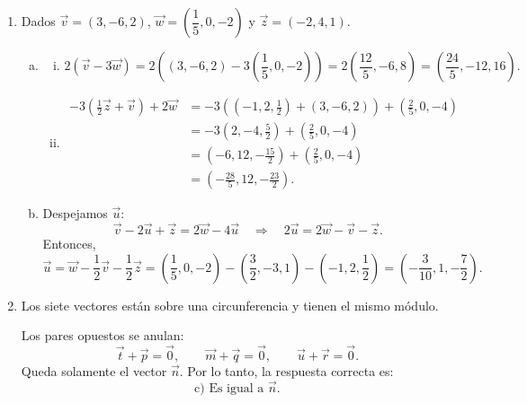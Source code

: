 \begin{enumerate}[\hspace{-3mm}$1)$]
\item Dados $\vec v=(3,-6,2)$, $\vec w=\left(\dfrac15,0,-2\right)$ y $\vec z=(-2,4,1)$.
\begin{sol}
\begin{enumerate}[a)]
\item
\begin{enumerate}[i)]
\item
\[
2(\vec v-3\vec w)=2\left((3,-6,2)-3\left(\frac15,0,-2\right)\right)
=2\left(\frac{12}{5},-6,8\right)=\left(\frac{24}{5},-12,16\right).
\]
\item
\[
\begin{aligned}
-3\left(\frac12\vec z+\vec v\right)+2\vec w
&=-3\left((-1,2,\frac12)+(3,-6,2)\right)+\left(\frac25,0,-4\right)\\
&=-3\left(2,-4,\frac52\right)+\left(\frac25,0,-4\right)\\
&=(-6,12,-\frac{15}{2})+\left(\frac25,0,-4\right)\\
&=\left(-\frac{28}{5},12,-\frac{23}{2}\right).
\end{aligned}
\]
\end{enumerate}
\item Despejamos $\vec u$:
\[
\vec v-2\vec u+\vec z=2\vec w-4\vec u
\quad\Rightarrow\quad
2\vec u=2\vec w-\vec v-\vec z.
\]
Entonces,
\[
\vec u=\vec w-\frac12\vec v-\frac12\vec z
=\left(\frac15,0,-2\right)-\left(\frac32,-3,1\right)-(-1,2,\frac12)
=\left(-\frac{3}{10},1,-\frac72\right).
\]
\end{enumerate}
\end{sol}

\item Los siete vectores están sobre una circunferencia y tienen el mismo módulo.
\begin{sol}
Los pares opuestos se anulan:
\[
\vec t+\vec p=\vec 0,\qquad \vec m+\vec q=\vec 0,\qquad \vec u+\vec r=\vec 0.
\]
Queda solamente el vector $\vec n$. Por lo tanto, la respuesta correcta es:
\[
\boxed{\text{c) Es igual a }\vec n.}
\]
\begin{center}
\end{center}
\end{sol}


\end{enumerate}
